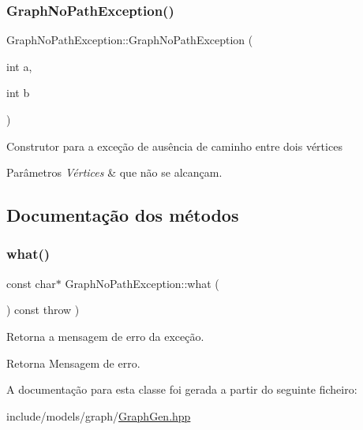 \subsubsection{\texorpdfstring{Graph\+No\+Path\+Exception()}{GraphNoPathException()}}
{\footnotesize\ttfamily Graph\+No\+Path\+Exception\+::\+Graph\+No\+Path\+Exception (\begin{DoxyParamCaption}\item[{int}]{a,  }\item[{int}]{b }\end{DoxyParamCaption})\hspace{0.3cm}{\ttfamily [inline]}}

Construtor para a exceção de ausência de caminho entre dois vértices 
\begin{DoxyParams}{Parâmetros}
{\em Vértices} & que não se alcançam. \\
\hline
\end{DoxyParams}


\subsection{Documentação dos métodos}
\mbox{\label{classGraphNoPathException_a33d7ba709a76ad03175a929e8313221c}} 
\subsubsection{\texorpdfstring{what()}{what()}}
{\footnotesize\ttfamily const char$\ast$ Graph\+No\+Path\+Exception\+::what (\begin{DoxyParamCaption}{ }\end{DoxyParamCaption}) const throw  ) \hspace{0.3cm}{\ttfamily [inline]}}

Retorna a mensagem de erro da exceção. \begin{DoxyReturn}{Retorna}
Mensagem de erro. 
\end{DoxyReturn}


A documentação para esta classe foi gerada a partir do seguinte ficheiro\+:\begin{DoxyCompactItemize}
\item 
include/models/graph/\hyperlink{GraphGen_8hpp}{Graph\+Gen.\+hpp}\end{DoxyCompactItemize}

